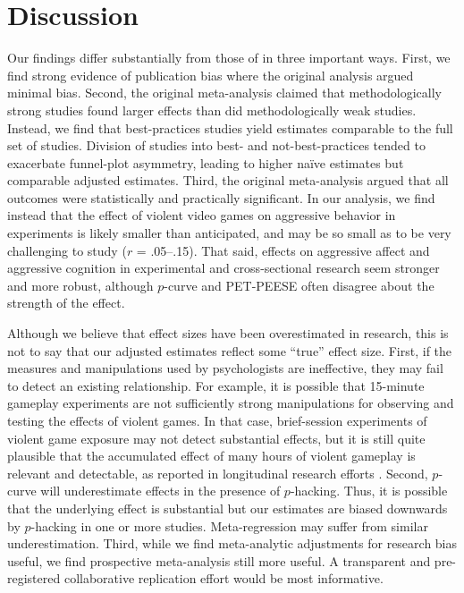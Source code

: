 \documentclass[man]{apa6}
\begin{document}
\section{Discussion}
Our findings differ substantially from those of \citet{Anderson:etal:2010} in three important ways. First, we find strong evidence of publication bias where the original analysis argued minimal bias. Second, the original meta-analysis claimed that methodologically strong studies found larger effects than did methodologically weak studies. Instead, we find that best-practices studies yield estimates comparable to the full set of studies. Division of studies into best- and not-best-practices tended to exacerbate funnel-plot asymmetry, leading to higher na{\"i}ve estimates but comparable adjusted estimates.  
Third, the original meta-analysis argued that all outcomes were statistically and practically significant. In our analysis, we find instead that the effect of violent video games on aggressive behavior in experiments is likely smaller than anticipated, and may be so small as to be very challenging to study ($r$ = .05--.15). That said, effects on aggressive affect and aggressive cognition in experimental and cross-sectional research seem stronger and more robust, although $p$-curve and PET-PEESE often disagree about the strength of the effect.


Although we believe that effect sizes have been overestimated in research, this is not to say that our adjusted estimates reflect some ``true'' effect size. First, if the measures and manipulations used by psychologists are ineffective, they may fail to detect an existing relationship. For example, it is possible that 15-minute gameplay experiments are not sufficiently strong manipulations for observing and testing the effects of violent games. In that case, brief-session experiments of violent game exposure may not detect substantial effects, but it is still quite plausible that the accumulated effect of many hours of violent gameplay is relevant and detectable, as reported in longitudinal research efforts \citep[e.g.,][]{Willoughby:etal:2012}. Second, $p$-curve will underestimate effects in the presence of $p$-hacking. Thus, it is possible that the underlying effect is substantial but our estimates are biased downwards by $p$-hacking in one or more studies. Meta-regression may suffer from similar underestimation. Third, while we find meta-analytic adjustments for research bias useful, we find prospective meta-analysis still more useful. A transparent and pre-registered collaborative replication effort would be most informative.
\end{document}
